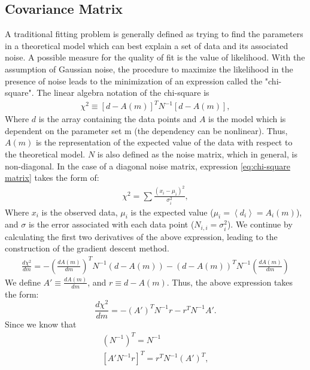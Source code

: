 \documentclass[12pt, TexShade, letterpaper]{report}
\begin{document}
\subsection{Covariance Matrix}
\label{chap:method,sub:cov_mat}
A traditional fitting problem is generally defined as trying to find the parameters in a theoretical model which can best explain a set of data and its associated noise. A possible measure for the quality of fit is the value of likelihood. With the assumption of Gaussian noise, the procedure to maximize the likelihood in the presence of noise leads to the minimization of an expression called the "chi-square". The linear algebra notation of the chi-square is
\begin{gather}
    \chi^2 \equiv \left [d-A\left(m\right)\right]^T N^{-1} \left[d-A\left(m\right)\right],
    \label{eq:chi-square matrix}
\end{gather}
Where $d$ is the array containing the data points and $A$ is the model which is dependent on the parameter set m (the dependency can be nonlinear). Thus, $A(m)$ is the representation of the expected value of the data with respect to the theoretical model. $N$ is also defined as the noise matrix, which in general, is non-diagonal. In the case of a diagonal noise matrix, expression \ref{eq:chi-square matrix} takes the form of:
\begin{gather}
    \chi^2 = \sum \frac {\left(x_i - \mu_i\right)^2}{\sigma^2_{i}},
    \label{eq: chi-sqaure simple}
\end{gather}
Where $x_i$ is the observed data, $\mu_i$ is the expected value ($\mu_i=\left<d_i\right>=A_i\left(m\right)$), and $\sigma$ is the error associated with each data point ($N_{i, i} = \sigma^2_{i}$). We continue by calculating the first two derivatives of the above expression, leading to the construction of the gradient descent method.
\begin{gather}
        \frac{d \chi^2}{dm} = - \left(\frac{dA\left(m\right)}{dm}\right)^T N^{-1} (d-A(m)) - \left(d-A\left(m\right)\right)^T N^{-1} \left(\frac{dA(m)}{dm}\right ) 
\end{gather}
We define $A' \equiv\frac{dA(m)}{dm}$, and $r \equiv d - A(m)$. Thus, the above expression takes the form:
\begin{equation}
    \frac{d \chi^2}{dm} = - \left(A'\right)^T N^{-1} r - r^T N^{-1} A'.
    \label{eq:csq_first_deriv}
\end{equation}
Since we know that 
\begin{gather}
    \left(N^{-1}\right)^T = N^{-1}\\
    \left[A' N^{-1} r\right]^T = r^T N^{-1} \left(A'\right)^T,
\end{gather}
\end{document}

